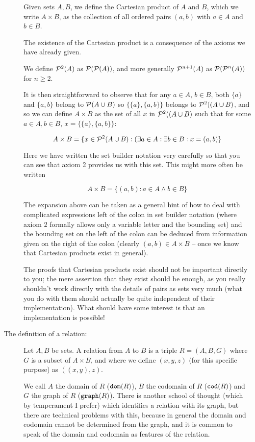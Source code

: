 \documentclass[12pt]{article}
\begin{document}
\begin{description}
Given sets $A,B$, we define the Cartesian product of $A$ and $B$, which we write $A \times B$,  as the collection of all ordered pairs
$(a,b)$ with $a \in A$ and $b \in B$.

The existence of the Cartesian product is a consequence of the axioms we have already given.

We define ${\cal P}^2(A)$ as ${\cal P}({\cal P}(A))$, and more generally ${\cal P}^{n+1}(A)$ as 
${\cal P}({\cal P}^n(A))$ for $n \geq 2$.

It is then straightforward to observe that for any $a \in A$, $b \in B$, both $\{a\}$ and $\{a,b\}$ belong to ${\cal P}(A \cup B)$ so $\{\{a\},\{a,b\}\}$ belongs to ${\cal P}^2((A \cup B)$, and so we can define $A \times B$ as the set of all $x$ in ${\cal P}^2((A \cup B)$ such that for some $a\in A, b\in B$, $x = \{\{a\},\{a,b\}\}$:

$$A \times B = \{x \in {\cal P}^2(A \cup B):(\exists a \in A:\exists b \in B:x=(a,b)\}$$

Here we have written the set builder notation very carefully so that you can see that axiom 2 provides us with this set.  This might more often be written

$$A \times B = \{(a,b):a \in A \wedge b \in B\}$$

The expansion above can be taken as a general hint of how to deal with complicated expressions left of the colon in set builder notation (where axiom 2 formally allows
only a variable letter and the bounding set) and the bounding set on the left of the colon can be deduced from information given on the right of the colon (clearly $(a,b) \in A \times B$ -- once we know that Cartesian products exist in general).

The proofs that Cartesian products exist should not be important directly to you;  the mere assertion that they exist should be enough, as you really shouldn't work directly with the details of pairs as sets very much (what you do with them should actually be quite independent of their implementation).  What should have some interest is that an implementation is possible!

\item[The definition of a relation:]

Let $A,B$ be sets.  A relation from $A$ to $B$ is a triple $R=(A,B,G)$ where $G$ is a subset of $A \times B$, and where we define $(x,y,z)$ (for this specific purpose) as $((x,y),z)$.

We call $A$ the domain of $R$ (${\tt dom}(R)$), $B$ the codomain of $R$ (${\tt cod}(R)$) and $G$ the graph of $R$ (${\tt graph}(R)$).   There is another school of thought
(which by temperament I prefer) which identifies a relation with its graph, but there are technical problems with this, because in general the domain and codomain cannot be determined from the graph, and it is common to speak of the domain and codomain as features of the relation.


\end{description}
\end{document}
